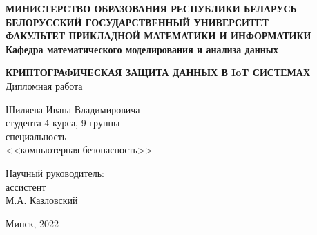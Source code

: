  
 \begin{titlepage}
 	 \begin{center}
 		\textbf{
 			\small{МИНИСТЕРСТВО ОБРАЗОВАНИЯ РЕСПУБЛИКИ БЕЛАРУСЬ}\\
 			\vspace{0.5em}
 			\small{БЕЛОРУССКИЙ ГОСУДАРСТВЕННЫЙ УНИВЕРСИТЕТ}\\
 			\vspace{0.5em}
 			\small{ФАКУЛЬТЕТ ПРИКЛАДНОЙ МАТЕМАТИКИ И ИНФОРМАТИКИ}\\
 			\vspace{0.5em}
 			Кафедра математического моделирования и анализа данных\\
 		}
 	\end{center}
 	
 	\vspace{7em}
 	
 	\begin{center}
 		{\bf КРИПТОГРАФИЧЕСКАЯ ЗАЩИТА ДАННЫХ В IoT СИСТЕМАХ} \\
 		\vspace{5mm}
 		{Дипломная работа}
 	\end{center}
 	
 	\vspace{8em}
 	
 	\begin{flushright}
 		Шиляева Ивана Владимировича\\
 		студента 4 курса, 9 группы\\
 		специальность\\
 		<<компьютерная безопасность>>
 	\end{flushright}
 	
 	\begin{flushright}
 		Научный руководитель:\\
 		ассистент\\
 		М.А. Казловский\\
 	\end{flushright}
 	
 	\vfill
 	
 	\begin{center}
 		{Минск, 2022}
 	\end{center}
 \end{titlepage}